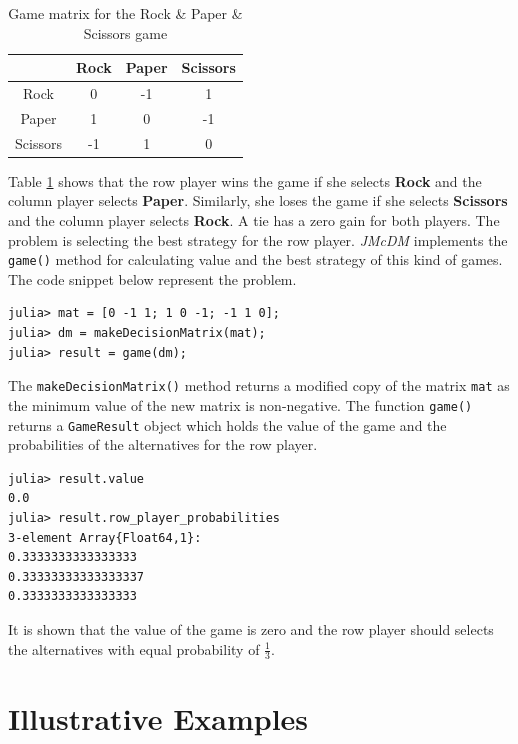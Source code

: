 \documentclass[preprint,review, 12pt, a4paper]{elsarticle}
\begin{document}
\begin{table}[H]
	\centering
	\begin{tabular}{|c|c|c|c|}
		\hline
		\textbf{} & {Rock} &  {Paper} & {Scissors}\\
		\hline
		\hline
		{Rock} &  0 & -1 & 1 \\
		\hline
		{Paper} & 1 & 0 & -1 \\
		\hline
		{Scissors} & -1 & 1 & 0 \\
		\hline
	\end{tabular}
	\caption{Game matrix for the Rock \& Paper \& Scissors game}
	\label{table:game_matrix} 
\end{table}

\noindent Table \ref{table:game_matrix} shows that the row player wins the game if she selects \textbf{Rock} and the column player selects \textbf{Paper}. Similarly, she loses the game if she selects
\textbf{Scissors} and the column player selects \textbf{Rock}. A tie has a zero gain for both players. The problem is selecting the best strategy for the row player. \emph{JMcDM} implements 
the \texttt{game()} method for calculating value and the best strategy of this kind of games. The code snippet below represent the problem.

\begin{verbatim}
julia> mat = [0 -1 1; 1 0 -1; -1 1 0];
julia> dm = makeDecisionMatrix(mat);
julia> result = game(dm);
\end{verbatim}

\noindent The \texttt{makeDecisionMatrix()} method returns a modified copy of the matrix \texttt{mat} as the minimum value of the new matrix is non-negative. The function \texttt{game()} returns 
a \texttt{GameResult} object which holds the value of the game and the probabilities of the alternatives for the row player.

\begin{verbatim}
julia> result.value
0.0
julia> result.row_player_probabilities
3-element Array{Float64,1}:
0.3333333333333333
0.33333333333333337
0.3333333333333333
\end{verbatim}

It is shown that the value of the game is zero and the row player should selects the alternatives with equal probability of  $\frac{1}{3}$.



\section{Illustrative Examples}
\label{sec:Illustrative_examples}
\end{document}
